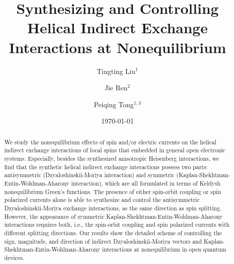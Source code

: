 \documentclass[aps,prb,twocolumn,showpacs,amssymb]{revtex4-1}
\begin{document}
%
%

\title{Synthesizing and Controlling Helical Indirect Exchange Interactions at Nonequilibrium}


\author{Tingting Liu$^1$}
\author{Jie Ren$^2$}
\author{Peiqing Tong$^{1,3}$}


\date{\today \\[0.3cm]}

%
%

\begin{abstract}
We study the nonequilibrium effects of spin and/or electric currents on the helical indirect exchange interactions of local spins that embedded in general open electronic systems. Especially, besides the synthesized anisotropic Heisenberg interactions, we find that the synthetic helical indirect exchange interactions possess two parts: antisymmetric (Dzyaloshinskii-Moriya interaction) and symmetric (Kaplan-Shekhtman-Entin-Wohlman-Aharony interaction), which are all formulated in terms of Keldysh nonequilibrium Green's functions.
The presence of either spin-orbit coupling or spin polarized currents alone is able to synthesize and control the antisymmetric Dzyaloshinskii-Moriya exchange interactions, as the same direction as spin splitting. However, the appearance of symmetric Kaplan-Shekhtman-Entin-Wohlman-Aharony interactions requires both, i.e., the spin-orbit coupling and spin polarized currents with different splitting directions.
Our results show the detailed scheme of controlling the sign, magnitude, and direction of indirect Dzyaloshinskii-Moriya vectors and Kaplan-Shekhtman-Entin-Wohlman-Aharony interactions at nonequilibrium in open quantum devices.
\end{abstract}
\end{document}
